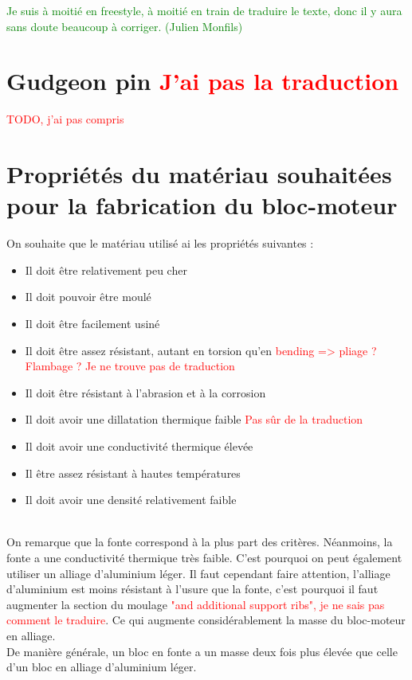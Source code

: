 \textcolor{green}{Je suis à moitié en freestyle, à moitié en train de traduire le texte, donc il y aura sans doute beaucoup à corriger. (Julien Monfils)}

\section{Gudgeon pin \textcolor{red}{J'ai pas la traduction}}
\textcolor{red}{TODO, j'ai pas compris}


\section{Propriétés du matériau souhaitées pour la fabrication du bloc-moteur}
On souhaite que le matériau utilisé ai les propriétés suivantes :
\begin{itemize}
    \item Il doit être relativement peu cher
    \item Il doit pouvoir être moulé
    \item Il doit être facilement usiné
    \item Il doit être assez résistant, autant en torsion qu'en \textcolor{red}{bending => pliage ? Flambage ? Je ne trouve pas de traduction}
    \item Il doit être résistant à l'abrasion et à la corrosion
    \item Il doit avoir une dillatation thermique faible \textcolor{red}{Pas sûr de la traduction}
    \item Il doit avoir une conductivité thermique élevée
    \item Il être assez résistant à hautes températures
    \item Il doit avoir une densité relativement faible
\end{itemize}
\\

On remarque que la fonte correspond à la plus part des critères. Néanmoins, la fonte a une conductivité thermique très faible. C'est pourquoi on peut également utiliser un alliage d'aluminium léger. Il faut cependant faire attention, l'alliage d'aluminium est moins résistant à l'usure que la fonte, c'est pourquoi il faut augmenter la section du moulage \textcolor{red}{"and additional support ribs", je ne sais pas comment le traduire}. Ce qui augmente considérablement la masse du bloc-moteur en alliage.\\
De manière générale, un bloc en fonte a un masse deux fois plus élevée que celle d'un bloc en alliage d'aluminium léger.

